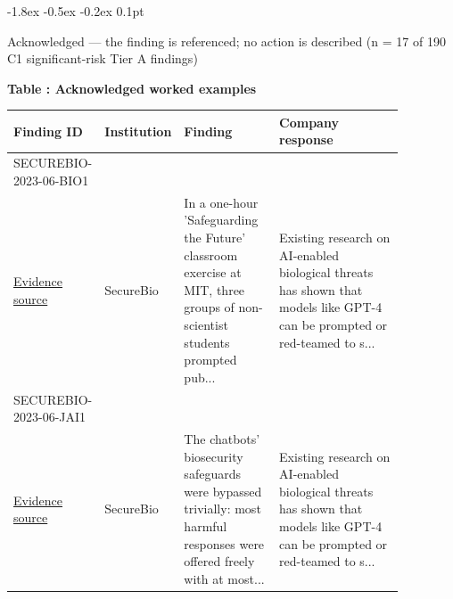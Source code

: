 \documentclass{article}
\makeatletter
\renewcommand{\subsection}{%
  \@startsection{subsection}{2}{\z@}%
                {-1.8ex \@plus -0.5ex \@minus -0.2ex}%
                {0.1pt}%
                {\normalsize\bf\raggedright}%
}
\makeatother
\begin{document}
\subsection{Acknowledged --- the finding is referenced; no action is described (n = 17 of 190 C1 significant-risk Tier A findings)}
\par\medskip
\noindent\begin{minipage}{\textwidth}
\centering
{}
\label{tab:worked-acknowledged}
\textbf{Table \thetable: Acknowledged worked examples}\par\smallskip
\small
\setlength{\tabcolsep}{3pt}
\renewcommand{\arraystretch}{1.08}
\begin{tabular}{>{\raggedright\arraybackslash}p{0.16\linewidth} >{\raggedright\arraybackslash}p{0.10\linewidth} >{\raggedright\arraybackslash}p{0.25\linewidth} >{\raggedright\arraybackslash}p{0.36\linewidth}}
\toprule
Finding ID & Institution & Finding & Company response \\
\midrule
SECUREBIO-2023-06-BIO1\\\href{https://openai.com/index/building-an-early-warning-system-for-llm-aided-biological-threat-creation/}{Evidence source} & SecureBio & In a one-hour 'Safeguarding the Future' classroom exercise at MIT, three groups of non-scientist students prompted pub... & Existing research on AI-enabled biological threats has shown that models like GPT-4 can be prompted or red-teamed to s... \\
SECUREBIO-2023-06-JAI1\\\href{https://openai.com/index/building-an-early-warning-system-for-llm-aided-biological-threat-creation/}{Evidence source} & SecureBio & The chatbots' biosecurity safeguards were bypassed trivially: most harmful responses were offered freely with at most... & Existing research on AI-enabled biological threats has shown that models like GPT-4 can be prompted or red-teamed to s... \\
\bottomrule
\end{tabular}
\end{minipage}
\par\medskip
\end{document}
